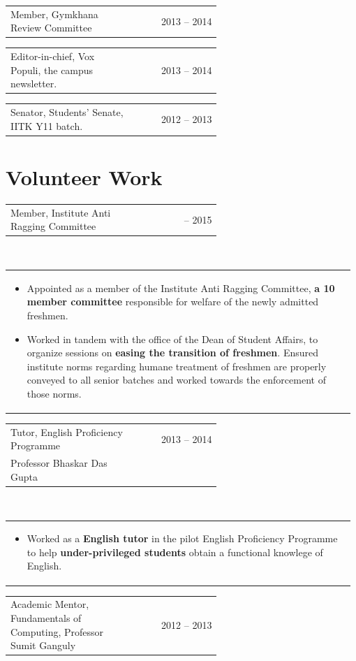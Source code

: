 \documentclass[a4paper]{article} %
\newcommand{\verticalspacing}{-0.25cm}
\newcommand{\headspace}{-0.3cm}
\newcommand{\bulletspace}{0.7cm}
\newcommand{\projectheadspacing}{6.9cm}
\newcommand{\cproject}[5]{%
    \begin{tabular}{p{0.60\linewidth}r}
        \textcolor{NavyBlue}{\small #2} & \multicolumn{1}{m{ \projectheadspacing{} }}{\raggedleft \small {\textsc{#1}}}\\
        \small {#3} & \small {#4}
    \end{tabular}\\
    \begin{tabular}{p{0.98\linewidth}}
    \vspace{-0.3cm}
        \small{#5}
    \end{tabular}
    \vspace{\verticalspacing{}}
}
\newcommand{\gitproject}[3]{%
    \begin{tabular}{p{0.60\linewidth}r}
        \textcolor{NavyBlue}{\small #2} & \multicolumn{1}{m{ \projectheadspacing{} }}{\raggedleft #1}\\
    \end{tabular}\\
    \begin{tabular}{p{0.98\linewidth}}
        \vspace{\headspace{}}
        \small{#3}
    \end{tabular}
    \vspace{\verticalspacing{}}
    \vspace{-0.2cm} %
}
\newcommand{\skill}[2]{%
    \begin{tabular}{p{0.60\linewidth}r}
        \small {#2} & \multicolumn{1}{m{ \projectheadspacing{} }}{\raggedleft \textsc{\small #1}}\\
    \end{tabular}
    \vspace{\verticalspacing{}}
}
\begin{document}
\skill
    {2013 -- 2014}
    {Member, Gymkhana Review Committee}

\skill
    {2013 -- 2014}
    {Editor-in-chief, Vox Populi, the campus newsletter.}

\skill
    {2012 -- 2013}
    {Senator, Students' Senate, IITK Y11 batch.}


\section{Volunteer Work}

\gitproject
    {2014 -- 2015}
    {Member, Institute Anti Ragging Committee}
    {%
        \begin{itemize}[leftmargin=\bulletspace{}]
            \item Appointed as a member of the Institute Anti Ragging Committee, \textbf{a 10 member committee} responsible
                for welfare of the newly admitted freshmen.
            \item Worked in tandem with the office of the Dean of Student Affairs, to organize sessions
                on \textbf{easing the transition of freshmen}.  Ensured institute norms regarding humane treatment
                of freshmen are properly conveyed to all senior batches and worked towards the enforcement of those norms.
        \end{itemize}
    }

\cproject
    {2013 -- 2014}
    {Tutor, English Proficiency Programme}
    {Professor Bhaskar Das Gupta}
    {}
    {%
        \begin{itemize}[leftmargin=\bulletspace{}]
            \item Worked as a \textbf{English tutor} in the pilot English Proficiency Programme to help
                \textbf{under-privileged students} obtain a functional knowlege of English.
        \end{itemize}
    }

\skill
    {2012 -- 2013}
    {Academic Mentor, Fundamentals of Computing, Professor Sumit Ganguly}

\end{document}
